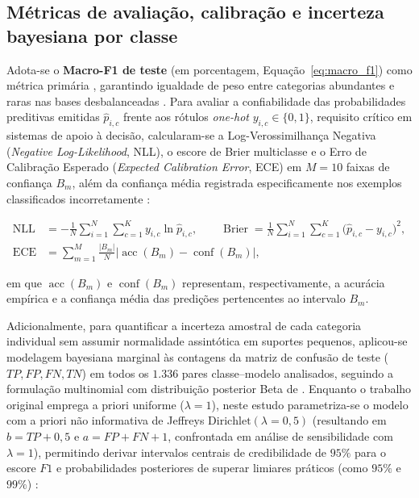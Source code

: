 \documentclass[
    12pt,
    openright,
    oneside,
    a4paper,
    english,
    brazil
]{abntex2}
\begin{document}
\subsection{Métricas de avaliação, calibração e incerteza bayesiana por classe}
\label{subsec:funcionalidades}
\label{subsec:criterios_validacao}

Adota-se o \textbf{Macro-F1 de teste} (em porcentagem, Equação~\eqref{eq:macro_f1}) como métrica primária \cite{fawcett2006roc,hand2001simple,sokolova2009systematic}, garantindo igualdade de peso entre categorias abundantes e raras nas bases desbalanceadas \cite{silva2025balanceamento}. Para avaliar a confiabilidade das probabilidades preditivas emitidas \(\hat{p}_{i,c}\) frente aos rótulos \textit{one-hot} \(y_{i,c} \in \{0, 1\}\), requisito crítico em sistemas de apoio à decisão, calcularam-se a Log-Verossimilhança Negativa (\textit{Negative Log-Likelihood}, NLL), o escore de Brier multiclasse e o Erro de Calibração Esperado (\textit{Expected Calibration Error}, ECE) em \(M = 10\) faixas de confiança \(B_m\), além da confiança média registrada especificamente nos exemplos classificados incorretamente \cite{guo2017calibration,brier1950verification}:

\begin{equation}
\label{eq:calibracao_nll_brier_ece}
\begin{aligned}
\operatorname{NLL} &= -\frac{1}{N}\sum_{i=1}^{N}\sum_{c=1}^{K} y_{i,c}\ln \hat{p}_{i,c}, \qquad
\operatorname{Brier} = \frac{1}{N}\sum_{i=1}^{N}\sum_{c=1}^{K} \bigl(\hat{p}_{i,c} - y_{i,c}\bigr)^2, \\
\operatorname{ECE} &= \sum_{m=1}^{M} \frac{|B_m|}{N}\bigl|\operatorname{acc}(B_m) - \operatorname{conf}(B_m)\bigr|,
\end{aligned}
\end{equation}

em que \(\operatorname{acc}(B_m)\) e \(\operatorname{conf}(B_m)\) representam, respectivamente, a acurácia empírica e a confiança média das predições pertencentes ao intervalo \(B_m\).

Adicionalmente, para quantificar a incerteza amostral de cada categoria individual sem assumir normalidade assintótica em suportes pequenos, aplicou-se modelagem bayesiana marginal às contagens da matriz de confusão de teste (\(TP, FP, FN, TN\)) em todos os \(1.336\) pares classe--modelo analisados, seguindo a formulação multinomial com distribuição posterior Beta de . Enquanto o trabalho original emprega a priori uniforme (\(\lambda = 1\)), neste estudo parametriza-se o modelo com a priori não informativa de Jeffreys \(\text{Dirichlet}(\lambda = 0{,}5)\) (resultando em \(b = TP + 0{,}5\) e \(a = FP + FN + 1\), confrontada em análise de sensibilidade com \(\lambda = 1\)), permitindo derivar intervalos centrais de credibilidade de \(95\%\) para o escore \(F1\) e probabilidades posteriores de superar limiares práticos (como \(95\%\) e \(99\%\)) \cite{wang2019bayestest}:
\end{document}

